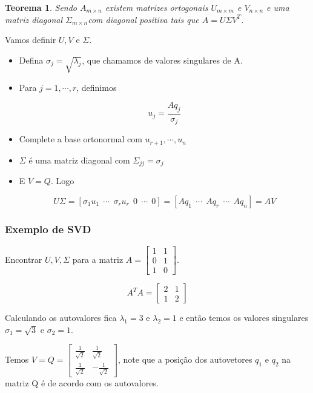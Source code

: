 \documentclass[12pt]{article}
\newtheorem{theorem}{Teorema}
\begin{document}
\begin{theorem}
    Sendo $A_{m \times n}$ existem matrizes ortogonais $U_{m \times m}$ e $V_{n \times n}$ e uma matriz diagonal ${\Sigma}_{m \times n} $com diagonal positiva tais que $A = U \Sigma V^T$.
\end{theorem}

Vamos definir $U, V$ e $\Sigma$.
\begin{itemize}
    \item Defina $\sigma_j = \sqrt{\lambda_j}$, que chamamos de valores singulares de A.
    
    \item Para $j = 1, \cdots, r$, definimos
    
    $$u_j = \dfrac{A q_j}{\sigma_j}$$
    
    \item Complete a base ortonormal com $u_{r + 1}, \cdots, u_n$
    
    \item $\Sigma$ é uma matriz diagonal com $\Sigma_{j j} = \sigma_j$
    
    \item E $V = Q$. Logo
    
    $$U \Sigma = \left[ \sigma_1 u_1 \ \ \cdots \ \ \sigma_r u_r \ \ 0 \ \ \cdots \ \ 0 \right] = \left[ A q_1 \ \ \cdots \ \ A q_r \ \ \cdots \ \ A q_n \right] = A V$$
\end{itemize}

\subsubsection*{Exemplo de SVD}
Encontrar $U, V, \Sigma$ para a matriz $A = \left[ \begin{array}{cc}
    1 & 1 \\
    0 & 1 \\
    1 & 0
\end{array} \right]$.

$$A^T A = \left[ \begin{array}{cc}
    2 & 1 \\
    1 & 2
\end{array} \right]$$

Calculando os autovalores fica $\lambda_1 = 3$ e $\lambda_2 = 1$ e então temos os valores singulares $\sigma_1 = \sqrt{3}$ e $\sigma_2 = 1$.

Temos $V = Q = \left[ \begin{array}{cc}
    \frac{1}{\sqrt{2}} & \frac{1}{\sqrt{2}} \\
    \frac{1}{\sqrt{2}} & - \frac{1}{\sqrt{2}}
\end{array} \right]$, note que a posição dos autovetores $q_1$ e $q_2$ na matriz Q é de acordo com os autovalores.
\end{document}
